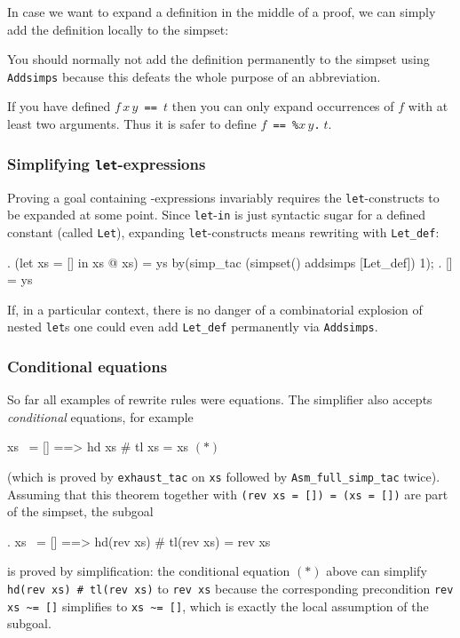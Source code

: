 In case we want to expand a definition in the middle of a proof, we can
simply add the definition locally to the simpset:
\begin{ttbox}
\end{ttbox}
You should normally not add the definition permanently to the simpset
using \texttt{Addsimps} because this defeats the whole purpose of an
abbreviation.

\begin{warn}
If you have defined $f\,x\,y$\texttt{~==~}$t$ then you can only expand
occurrences of $f$ with at least two arguments. Thus it is safer to define
$f$\texttt{~==~\%$x\,y$.}$\;t$.
\end{warn}

\subsubsection{Simplifying \texttt{let}-expressions}

Proving a goal containing -expressions invariably requires the
\texttt{let}-constructs to be expanded at some point. Since
\texttt{let}-\texttt{in} is just syntactic sugar for a defined constant
(called \texttt{Let}), expanding \texttt{let}-constructs means rewriting with
\texttt{Let_def}:
\begin{ttbox}\makeatother
{. (let xs = [] in xs @ xs) = ys}
by(simp_tac (simpset() addsimps [Let_def]) 1);
{. [] = ys}
\end{ttbox}
If, in a particular context, there is no danger of a combinatorial explosion
of nested \texttt{let}s one could even add \texttt{Let_def} permanently via
\texttt{Addsimps}.

\subsubsection{Conditional equations}

So far all examples of rewrite rules were equations. The simplifier also
accepts {\em conditional\/} equations, for example
\begin{ttbox}
xs ~= []  ==>  hd xs # tl xs = xs \hfill \((*)\)
\end{ttbox}
(which is proved by \texttt{exhaust_tac} on \texttt{xs} followed by
\texttt{Asm_full_simp_tac} twice). Assuming that this theorem together with
\texttt{(rev xs = []) = (xs = [])}
are part of the simpset, the subgoal
\begin{ttbox}\makeatother
{. xs ~= [] ==> hd(rev xs) # tl(rev xs) = rev xs}
\end{ttbox}
is proved by simplification:
the conditional equation $(*)$ above
can simplify \texttt{hd(rev~xs)~\#~tl(rev~xs)} to \texttt{rev xs}
because the corresponding precondition \verb$rev xs ~= []$ simplifies to
\verb$xs ~= []$, which is exactly the local assumption of the subgoal.


